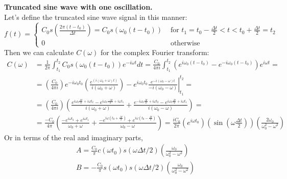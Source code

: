 \documentclass[twoside,10pt]{amsart}
\newcommand{\problemhead}[1]
  {\smallskip
   \noindent{\large\bf Problem #1.}
   \smallskip}
\begin{document}
\problemhead{6.16} \textbf{ Truncated sine wave with one oscillation.}  \quad \\ 
Let's define the truncated sine wave signal in this manner: \\
$f(t) = \begin{cases} C_0 s\left( \frac{2 \pi (t-t_0) }{ \Delta t} \right) = C_0 s( \omega_0 (t-t_0) ) & \text{ for } t_1 = t_0 - \frac{\Delta t}{2} < t < t_0 + \frac{ \Delta t}{2} = t_2 \\
  0 & \text{ otherwise } 
\end{cases} $\smallskip \\
Then we can calculate $C(\omega)$ for the complex Fourier transform:
\[
\begin{aligned}
  C(\omega) & = \frac{1}{2\pi} \int_{t_1}^{t_2} C_0 s(\omega_0 (t-t_0)) e^{-i\omega t} dt = \frac{C_0}{4\pi i} \int_{t_1}^{t_2} (e^{i\omega_0 (t-t_0)} - e^{ - i \omega_0(t-t_0) } )e^{ i \omega t } = \\
  & = \left( \frac{C_0}{4\pi i } \right) \left. e^{-i \omega_0 t_0 } \left( \frac{ e^{ (i (\omega_0 + \omega) t) } }{ i (\omega_0 + \omega ) } \right) - e^{ i \omega_0 t_0 } \frac{ e^{ -i(\omega_0 - \omega) t } }{ -i (\omega_0 - \omega) } \right|_{t_1}^{t_2} = \\
  & = \left( \frac{C_0}{ 4 \pi i } \right) \left(  \frac{ e^{i \omega_0 \frac{\Delta t}{2}  + i \omega t_2 } - e^{ i \omega_0 \frac{-\Delta t}{2} + i \omega t_1 } }{ i (\omega_0 + \omega ) } + \frac{ e^{ - i \omega_0 \frac{ \Delta t}{2} + i \omega t_2 } - e^{ i \omega_0 \frac{ \Delta t}{2} + i \omega t_1 } }{ i (\omega_0 - \omega) } \right) = \\
  & = \frac{ -C_0}{4\pi } \left( \frac{ - e^{ i \omega t_2 } + e^{i \omega t_1 }}{ \omega_0 + \omega } + \frac{ - e^{ i \omega (t_0 + \frac{\Delta t}{2} ) } + e^{ i \omega (t_0 - \frac{ \Delta t}{2} ) } }{ \omega_0 - \omega } \right)  = \boxed{ \frac{ i C_0 }{ 2 \pi } (e^{ i \omega t_0 } ) (\sin{ (\omega \frac{ \Delta t}{2} ) }) \left( \frac{ 2 \omega_0 }{ \omega_0^2 - \omega^2 } \right)  }
\end{aligned}
\]
Or in terms of the real and imaginary parts,
\[
\begin{aligned}
  & A = \frac{C_0}{\pi} c(\omega t_0) s(\omega \Delta t/2) \left( \frac{ \omega_0}{ \omega_0^2 - \omega^2 } \right) \\
  & B = -\frac{C_0}{\pi} s(\omega t_0) s(\omega \Delta t/2) \left( \frac{ \omega_0 }{ \omega_0^2 - \omega^2 } \right) 
\end{aligned}
\]
\end{document}
